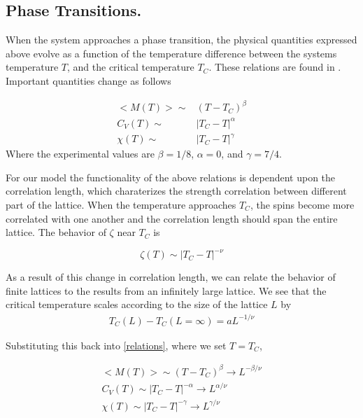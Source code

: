 \documentclass[a4paper]{article}
\begin{document}
\clearpage

\subsection{Phase Transitions.}\label{phasetrans}

When the system approaches a phase transition, the physical quantities expressed above evolve as a function of the temperature difference between the systems temperature $T$, and the critical temperature $T_C$. These relations are found in \cite{Project4Guide}. Important quantities change as follows

\begin{align}\label{relations}
<M(T)> \sim& (T-T_C)^{\beta}\\
C_V(T) \sim& |T_C-T|^{\alpha}\\
\chi(T) \sim& |T_C-T|^{\gamma}
\end{align}
Where the experimental values are $\beta = 1/8$, $\alpha = 0$, and $\gamma = 7/4.$

For our model the functionality of the above relations is dependent upon the correlation length, which charaterizes the strength correlation between different part of the lattice. When the temperature approaches $T_C$, the spins become more correlated with one another and the correlation length should span the entire lattice. The behavior of $\zeta$ near $T_C$ is

\begin{equation}\label{eq:corr}
\zeta(T) \sim |T_C-T|^{-\nu}
\end{equation}

As a result of this change in correlation length, we can relate the behavior of finite lattices to the results from an infinitely large lattice. We see that the critical temperature scales according to the size of the lattice $L$ by
\begin{align*}
T_C(L) - T_C(L=\infty) = aL^{-1/\nu}
\end{align*}

Substituting this back into \ref{relations}, where we set $T=T_C$,

\begin{align*}
<M(T)> \sim (T-T_C)^{\beta} \rightarrow L^{-\beta/\nu} \\
C_V(T) \sim |T_C-T|^{-\alpha} \rightarrow L^{\alpha/\nu}\\
\chi(T) \sim |T_C-T|^{-\gamma} \rightarrow L^{\gamma/\nu}
\end{align*}
\end{document}
